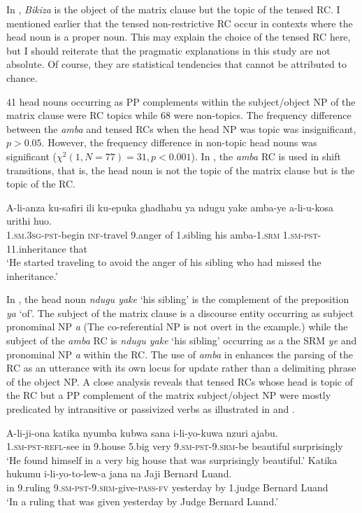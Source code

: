 \documentclass[output=paper,colorlinks,citecolor=brown]{langscibook}
\begin{document}
In , \textit{Bikiza} is the object of the matrix clause but the topic of the tensed RC. I mentioned earlier that the tensed non-restrictive RC occur in contexts where the head noun is a proper noun. This may explain the choice of the tensed RC here, but I should reiterate that the pragmatic explanations in this study are not absolute. Of course, they are statistical tendencies that cannot be attributed to chance.

41 head nouns occurring as PP complements within the subject/object NP of the matrix clause were RC topics while 68 were non-topics. The frequency difference between the \textit{amba} and tensed RCs when the head NP was topic was insignificant, $p>0.05$. However, the frequency difference in non-topic head nouns was significant ($\chi^2 (1,N=77)=31, p<0.001$). In , the \textit{amba} RC is used in shift transitions, that is, the head noun is not the topic of the matrix clause but is the topic of the RC.

\ea%
    \label{ex:mwamzandi:30}
    \gll    A-li-anza ku-safiri ili ku-epuka ghadhabu ya ndugu yake amba-ye a-li-u-kosa urithi huo.\\
            \textsc{1.sm.3sg-pst-}begin \textsc{inf-}travel 9.anger of 1.sibling his amba\textsc{-1.srm} \textsc{1.sm-pst-}11.inheritance that\\
    \glt    ‘He started traveling to avoid the anger of his sibling who had missed the inheritance.’
\z

In , the head noun \textit{ndugu yake} ‘his sibling’ is the complement of the preposition \textit{ya} ‘of’. The subject of the matrix clause is a discourse entity occurring as subject pronominal NP \textit{a} (The co-referential NP is not overt in the example.) while the subject of the \textit{amba} RC is \textit{ndugu yake} ‘his sibling’ occurring as a the SRM \textit{ye} and pronominal NP \textit{a} within the RC. The use of \textit{amba} in  enhances the parsing of the RC as an utterance with its own locus for update rather than a delimiting phrase of the object NP. A close analysis reveals that tensed RCs whose head is topic of the RC but a PP complement of the matrix subject/object NP were mostly predicated by intransitive or passivized verbs as illustrated in  and .

\ea%
    \label{ex:mwamzandi:31}
    \gll    A-li-ji-ona katika nyumba kubwa sana i-li-yo-kuwa nzuri ajabu.\\
            \textsc{1.sm-pst-refl-}see in 9.house 5.big very \textsc{9.sm-pst-9.srm-}be beautiful surprisingly\\
    \glt    ‘He found himself in a very big house that was surprisingly beautiful.’
\ex%
    \label{ex:mwamzandi:32}
    \gll    Katika hukumu i-li-yo-to-lew-a jana na Jaji Bernard Luand.\\
            in 9.ruling \textsc{9.sm-pst-9.srm-}give\textsc{-pass-fv} yesterday by 1.judge Bernard Luand\\
    \glt    ‘In a ruling that was given yesterday by Judge Bernard Luand.’
\z
\end{document}

